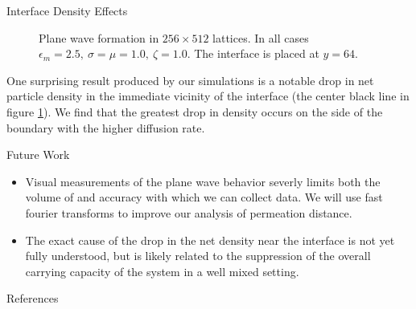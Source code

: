 \documentclass{beamer}
\begin{document}
\begin{frame}{}
\begin{textblock}{0.32}
\begin{block}{Interface Density Effects}
\begin{figure}[h]
            \caption{\centering Plane wave formation in $256 \times 512$ lattices. In all cases $\epsilon_m = 2.5, \ \sigma = \mu = 1.0, \ \zeta = 1.0$. The interface is placed at $y = 64$.}
            \label{fig:void}
        \end{figure}
        One surprising result produced by our simulations is a notable drop in 
        net particle density in the immediate vicinity of the interface (the center 
        black line in figure \ref{fig:void}). We find that the greatest drop in density 
        occurs on the side of the boundary with the higher diffusion rate. 
    \end{block}
    \begin{block}{Future Work}
        \begin{itemize}
            \item Visual measurements of the plane wave behavior severly limits both
                  the volume of and accuracy with which we can collect data. 
                  We will use fast fourier transforms to improve our analysis of permeation distance.
            \item The exact cause of the drop in the net density near the interface is 
                  not yet fully understood, but is likely related to the suppression
                  of the overall carrying capacity of the system in a well mixed setting.
        \end{itemize}
    \end{block}
    \begin{block}{References}
        
        
        

\end{block}
\end{textblock}
\end{frame}
\end{document}
